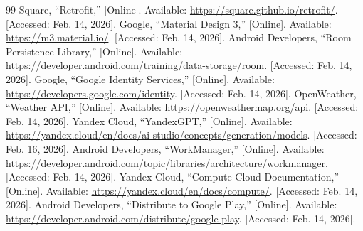 \documentclass[10pt,twocolumn]{article}
\begin{document}
\begin{thebibliography}{99}
Square, ``Retrofit,'' [Online]. Available: \url{https://square.github.io/retrofit/}. [Accessed: Feb. 14, 2026].
Google, ``Material Design 3,'' [Online]. Available: \url{https://m3.material.io/}. [Accessed: Feb. 14, 2026].
Android Developers, ``Room Persistence Library,'' [Online]. Available: \url{https://developer.android.com/training/data-storage/room}. [Accessed: Feb. 14, 2026].
Google, ``Google Identity Services,'' [Online]. Available: \url{https://developers.google.com/identity}. [Accessed: Feb. 14, 2026].
OpenWeather, ``Weather API,'' [Online]. Available: \url{https://openweathermap.org/api}. [Accessed: Feb. 14, 2026].
Yandex Cloud, ``YandexGPT,'' [Online]. Available: \url{https://yandex.cloud/en/docs/ai-studio/concepts/generation/models}. [Accessed: Feb. 16, 2026].
Android Developers, ``WorkManager,'' [Online]. Available: \url{https://developer.android.com/topic/libraries/architecture/workmanager}. [Accessed: Feb. 14, 2026].
Yandex Cloud, ``Compute Cloud Documentation,'' [Online]. Available: \url{https://yandex.cloud/en/docs/compute/}. [Accessed: Feb. 14, 2026].
Android Developers, ``Distribute to Google Play,'' [Online]. Available: \url{https://developer.android.com/distribute/google-play}. [Accessed: Feb. 14, 2026].
\end{thebibliography}
\end{document}
